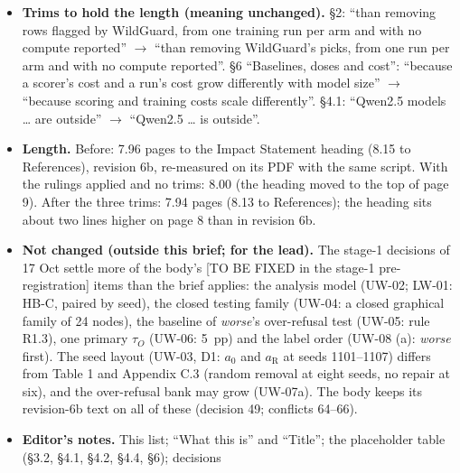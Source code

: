 \documentclass{article}
\theoremstyle{plain}
\theoremstyle{definition}
\theoremstyle{remark}
\begin{document}
\begin{itemize}
        6e; decision 48 was then no longer RESOLVED; the body's [PLANNED;
        funding-gated; first 7--8B model cut] marker is unchanged). The lead's
        two corrections to FAQ's mapping of the rule (FOCUS fcf79a2):
        Llama-3.1-8B's third Gate A seed waits for money beyond the wave-1
        reserve (decision 50); $R_{\mathrm{tok}}$ is the ambitious arm, with the
        token-axis analysis as its fallback (item 3).
  \item \textbf{Trims to hold the length (meaning unchanged).} \S{}2: ``than
        removing rows flagged by WildGuard, from one training run per arm and
        with no compute reported'' $\to$ ``than removing WildGuard's picks, from
        one run per arm and with no compute reported''. \S{}6 ``Baselines, doses
        and cost'': ``because a scorer's cost and a run's cost grow differently
        with model size'' $\to$ ``because scoring and training costs scale
        differently''. \S{}4.1: ``Qwen2.5 models \ldots{} are outside'' $\to$
        ``Qwen2.5 \ldots{} is outside''.
  \item \textbf{Length.} Before: 7.96 pages to the Impact Statement heading
        (8.15 to References), revision 6b, re-measured on its PDF with the same
        script. With the rulings applied and no trims: 8.00 (the heading moved
        to the top of page 9). After the three trims: 7.94 pages (8.13 to
        References); the heading sits about two lines higher on page 8 than in
        revision 6b.
  \item \textbf{Not changed (outside this brief; for the lead).} The stage-1
        decisions of 17 Oct settle more of the body's [TO BE FIXED in the
        stage-1 pre-registration] items than the brief applies: the analysis
        model (UW-02; LW-01: HB-C, paired by seed), the closed testing family
        (UW-04: a closed graphical family of 24 nodes), the baseline of
        \emph{worse}'s over-refusal test (UW-05: rule R1.3), one primary
        $\tau_{O}$ (UW-06: 5~pp) and the label order (UW-08 (a): \emph{worse}
        first). The seed layout (UW-03, D1: $a_0$ and $a_{\mathrm{R}}$ at seeds
        1101--1107) differs from Table 1 and Appendix C.3 (random removal at
        eight seeds, no repair at six), and the over-refusal bank may grow
        (UW-07a). The body keeps its revision-6b text on all of these (decision
        49; conflicts 64--66).
  \item \textbf{Editor's notes.} This list; ``What this is'' and ``Title''; the
        placeholder table (\S{}3.2, \S{}4.1, \S{}4.2, \S{}4.4, \S{}6); decisions

\end{itemize}
\end{document}
